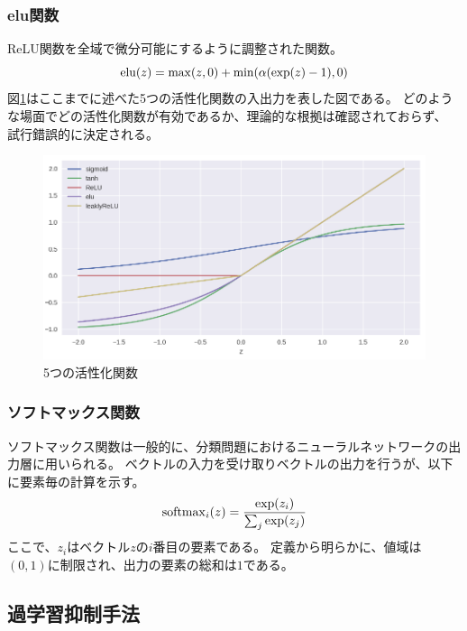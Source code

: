 \subsubsection{elu関数}
ReLU関数を全域で微分可能にするように調整された関数。
\begin{equation}
    {\rm elu}(z) = \max(z,0) + \min(\alpha(\exp(z)-1), 0)
\end{equation}
図\ref{fig:activation}はここまでに述べた5つの活性化関数の入出力を表した図である。
どのような場面でどの活性化関数が有効であるか、理論的な根拠は確認されておらず、
試行錯誤的に決定される。
\begin{figure}
    \centering
    \includegraphics[width=14cm]{images/activations.png}
    \caption{5つの活性化関数}
    \label{fig:activation}
\end{figure}

\subsubsection{ソフトマックス関数}
ソフトマックス関数は一般的に、分類問題におけるニューラルネットワークの出力層に用いられる。
ベクトルの入力を受け取りベクトルの出力を行うが、以下に要素毎の計算を示す。
\begin{equation}
   {\rm softmax}_i(z) = \frac{\exp(z_i)}{\sum_j \exp(z_j)} 
\end{equation}
ここで、\(z_i\)はベクトル\(z\)の\(i\)番目の要素である。
定義から明らかに、値域は\((0,1)\)に制限され、出力の要素の総和は\(1\)である。

\subsection{過学習抑制手法}
